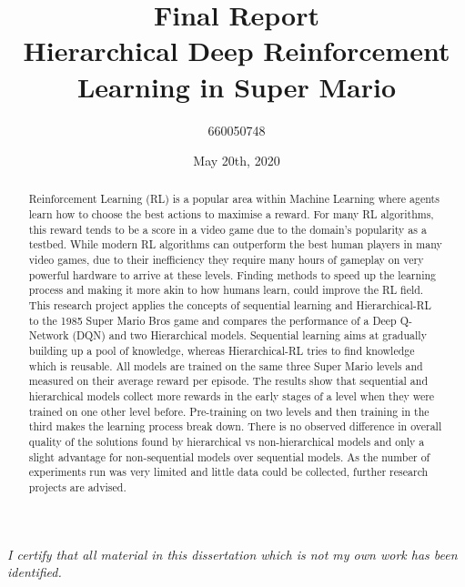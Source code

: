 \documentclass[notitlepage,a4paper,11pt]{article}
\begin{document}
\title{\textbf{Final Report\\
	\large{Hierarchical Deep Reinforcement Learning in Super Mario}}}

\author{660050748}
\date{May 20th, 2020}
\maketitle

\begin{abstract}
Reinforcement Learning (RL) is a popular area within Machine Learning where agents learn how to choose the best actions to maximise a reward. For many RL algorithms, this reward tends to be a score in a video game due to the domain's popularity as a testbed. While modern RL algorithms can outperform the best human players in many video games, due to their inefficiency they require many hours of gameplay on very powerful hardware to arrive at these levels. Finding methods to speed up the learning process and making it more akin to how humans learn, could improve the RL field. This research project applies the concepts of sequential learning and Hierarchical-RL to the 1985 Super Mario Bros game and compares the performance of a Deep Q-Network (DQN) and two Hierarchical models. Sequential learning aims at gradually building up a pool of knowledge, whereas Hierarchical-RL tries to find knowledge which is reusable. All models are trained on the same three Super Mario levels and measured on their average reward per episode. The results show that sequential and hierarchical models collect more rewards in the early stages of a level when they were trained on one other level before. Pre-training on two levels and then training in the third makes the learning process break down. There is no observed difference in overall quality of the solutions found by hierarchical vs non-hierarchical models and only a slight advantage for non-sequential models over sequential models. As the number of experiments run was very limited and little data could be collected, further research projects are advised.
\end{abstract}


\vspace*{\fill}
\textit{I certify that all material in this dissertation which is not my own work has been identified.}

\fancyhf{}
\fancyhead[LE]{\leftmark}
\fancyhead[RO]{\rightmark}

\fancyfoot[LE,RO]{\thepage}
\pagebreak

\tableofcontents
\end{document}
